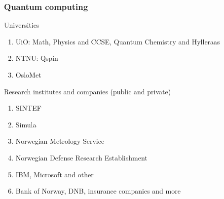 \documentclass{beamer}
\begin{document}
\begin{frame}
\frametitle{Quantum computing}

\begin{block}{Universities }
\begin{enumerate}
\item UiO: Math, Physics and CCSE, Quantum Chemistry and Hylleraas

\item NTNU: Qspin

\item OsloMet
\end{enumerate}

\noindent
\end{block}

\begin{block}{Research institutes and companies (public and private) }
\begin{enumerate}
\item SINTEF

\item Simula

\item Norwegian Metrology Service

\item Norwegian Defense Research Establishment

\item IBM, Microsoft and other

\item Bank of Norway, DNB, insurance companies and more
\end{enumerate}

\noindent
\end{block}
\end{frame}
\end{document}
